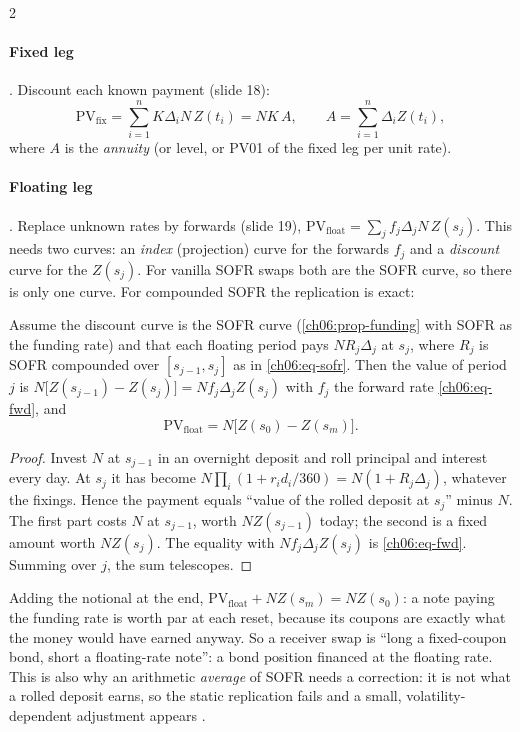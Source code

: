 \begin{paracol}{2}
\paragraph{Fixed leg} . Discount each known payment (slide 18):
\begin{equation}\label{ch06:eq-fixed}
  \mathrm{PV}_{\mathrm{fix}}=\sum_{i=1}^{n}K\Delta_iN\,Z(t_i)=NK\,A,\qquad
  A=\sum_{i=1}^{n}\Delta_iZ(t_i),
\end{equation}
where $A$ is the \emph{annuity} (or level, or PV01 of the fixed leg per unit rate).

\paragraph{Floating leg} . Replace unknown rates by forwards (slide 19),
$\mathrm{PV}_{\mathrm{float}}=\sum_{j}f_j\Delta_jN\,Z(s_j)$. This needs two curves: an \emph{index} (projection)
curve for the forwards $f_j$ and a \emph{discount} curve for the $Z(s_j)$. For vanilla SOFR swaps both are the
SOFR curve, so there is only one curve. For compounded SOFR the replication is exact:

\begin{proposition}\label{ch06:prop-float}
Assume the discount curve is the SOFR curve (\cref{ch06:prop-funding} with SOFR as the funding rate) and that
each floating period pays $NR_j\Delta_j$ at $s_j$, where $R_j$ is SOFR compounded over $[s_{j-1},s_j]$ as in
\eqref{ch06:eq-sofr}. Then the value of period $j$ is $N\bigl[Z(s_{j-1})-Z(s_j)\bigr]=Nf_j\Delta_jZ(s_j)$ with
$f_j$ the forward rate \eqref{ch06:eq-fwd}, and
\begin{equation}\label{ch06:eq-float}
  \mathrm{PV}_{\mathrm{float}}=N\bigl[Z(s_0)-Z(s_m)\bigr].
\end{equation}
\end{proposition}
\begin{proof}
Invest $N$ at $s_{j-1}$ in an overnight deposit and roll principal and interest every day. At $s_j$ it has become
$N\prod_i(1+r_id_i/360)=N(1+R_j\Delta_j)$, whatever the fixings. Hence the payment equals ``value of the rolled
deposit at $s_j$'' minus $N$. The first part costs $N$ at $s_{j-1}$, worth $NZ(s_{j-1})$ today; the second is a
fixed amount worth $NZ(s_j)$. The equality with $Nf_j\Delta_jZ(s_j)$ is \eqref{ch06:eq-fwd}. Summing over $j$,
the sum telescopes.
\end{proof}

\begin{intuition}
Adding the notional at the end, $\mathrm{PV}_{\mathrm{float}}+NZ(s_m)=NZ(s_0)$: a note paying the funding rate
is worth par at each reset, because its coupons are exactly what the money would have earned anyway. So a
receiver swap is ``long a fixed-coupon bond, short a floating-rate note'': a bond position financed at the
floating rate. This is also why an arithmetic \emph{average} of SOFR needs a correction: it is not what a rolled
deposit earns, so the static replication fails and a small, volatility-dependent adjustment appears
.
\end{intuition}


\end{paracol}
